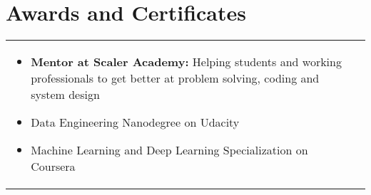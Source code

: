 \documentclass[a4paper,8pt]{article}
\begin{document}
\section{Awards and Certificates}
\begin{tabularx}{\linewidth}{ @{}l r@{} }
\begin{minipage}[t]{\linewidth}
    \begin{itemize}[nosep,after=\strut, leftmargin=2em, itemsep=2pt]
        \item \textbf{Mentor at Scaler Academy:} Helping students and working professionals to get better at problem solving, coding and system design
        \item Data Engineering Nanodegree on Udacity
        \item Machine Learning and Deep Learning Specialization on Coursera
    \end{itemize}
\end{minipage}
\end{tabularx}
\end{document}
